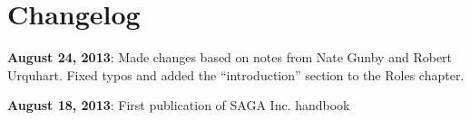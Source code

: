 \chapter*{Changelog}

\textbf{August 24, 2013}: Made changes based on notes from Nate Gunby and Robert Urquhart. Fixed typos and added the ``introduction'' section to the Roles chapter.

\textbf{August 18, 2013}: First publication of SAGA Inc. handbook